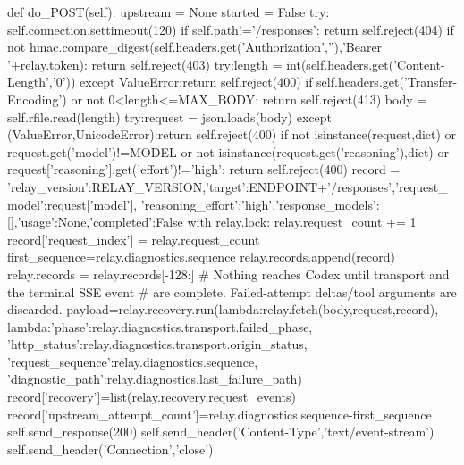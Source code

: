             def do_POST(self):
                upstream = None
                started = False
                try:
                    self.connection.settimeout(120)
                    if self.path!='/responses':
                        return self.reject(404)
                    if not hmac.compare_digest(self.headers.get('Authorization',''),'Bearer '+relay.token):
                        return self.reject(403)
                    try:length = int(self.headers.get('Content-Length','0'))
                    except ValueError:return self.reject(400)
                    if self.headers.get('Transfer-Encoding') or not 0<length<=MAX_BODY:
                        return self.reject(413)
                    body = self.rfile.read(length)
                    try:request = json.loads(body)
                    except (ValueError,UnicodeError):return self.reject(400)
                    if not isinstance(request,dict) or request.get('model')!=MODEL or not isinstance(request.get('reasoning'),dict) or request['reasoning'].get('effort')!='high':
                        return self.reject(400)
                    record = {'relay_version':RELAY_VERSION,'target':ENDPOINT+'/responses','request_model':request['model'],
                              'reasoning_effort':'high','response_models':[],'usage':None,'completed':False}
                    with relay.lock:
                        relay.request_count += 1
                        record['request_index'] = relay.request_count
                        first_sequence=relay.diagnostics.sequence
                        relay.records.append(record)
                        relay.records = relay.records[-128:]
                    # Nothing reaches Codex until transport and the terminal SSE event
                    # are complete. Failed-attempt deltas/tool arguments are discarded.
                    payload=relay.recovery.run(lambda:relay.fetch(body,request,record),
                        lambda:{'phase':relay.diagnostics.transport.failed_phase,
                                'http_status':relay.diagnostics.transport.origin_status,
                                'request_sequence':relay.diagnostics.sequence,
                                'diagnostic_path':relay.diagnostics.last_failure_path})
                    record['recovery']=list(relay.recovery.request_events)
                    record['upstream_attempt_count']=relay.diagnostics.sequence-first_sequence
                    self.send_response(200)
                    self.send_header('Content-Type','text/event-stream')
                    self.send_header('Connection','close')
